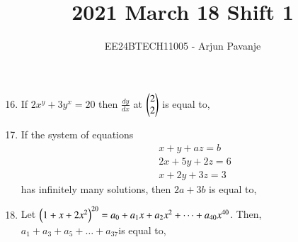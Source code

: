 \documentclass[journal]{IEEEtran}
\begin{document}

\vspace{3cm}
	
\title{2021 March 18 Shift 1}
\author{EE24BTECH11005 - Arjun Pavanje}
{\let\newpage\relax\maketitle}
\begin{enumerate}
	\setcounter{enumi}{15}
\item If $2x^y+3y^x=20$ then $\frac{dy}{dx}$ at $\begin{pmatrix}2\\2\end{pmatrix}$ is equal to,
		\begin{enumerate}
		\end{enumerate}
	\item If the system of equations
		\begin{align*}
			&x+y+az=b\\
			&2x+5y+2z=6\\
			&x+2y+3z=3
		\end{align*}
		has infinitely many solutions, then $2a+3b$ is equal to, 
		\begin{enumerate}
				\begin{multicols}{2}
					\item 28
				\columnbreak
					\item 20
				\end{multicols}
				\begin{multicols}{2}
					\item 25
				\columnbreak
					\item 23
				\end{multicols}
		\end{enumerate}
	\item Let $\left(1+x+2x^2\right)^{20}=a_0+a_1x+a_2x^2+\dots+a_{40}x^{40}$. Then, $a_1+a_3+a_5+\dots+a_{37}$is equal to,

\end{enumerate}
\end{document}
